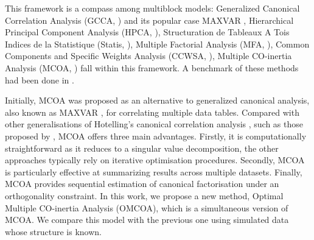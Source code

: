 \documentclass[11pt]{article}
\begin{document}
This framework is a compass among multiblock models:  Generalized Canonical Correlation Analysis (GCCA, \cite{Carroll68}) and its popular case MAXVAR \cite{Carroll68}, Hierarchical Principal Component Analysis (HPCA, \cite{Wold96,Westerhuis98}), Structuration de Tableaux A Tois Indices de la Statistique (Statis, \cite{Lavit94}), Multiple Factorial Analysis (MFA, \cite{escofier1994}), Common Components and Specific Weights Analysis (CCWSA, \cite{Qannari001}), Multiple CO-inertia Analysis (MCOA, \cite{Chessel96})  fall within this framework. A benchmark of these methods had been done in \cite{Bougeard024}.

Initially, MCOA was proposed as an alternative to generalized canonical analysis, also known as MAXVAR \cite{Carroll68,Horst59}, for correlating multiple data tables. Compared with other generalisations of Hotelling's canonical correlation analysis \cite{Hotelling35}, such as those proposed by \cite{Kettenring71}, MCOA offers three main advantages. Firstly, it is computationally straightforward as it reduces to a singular value decomposition, the other approaches typically rely on iterative optimisation procedures. Secondly, MCOA is particularly effective at summarizing results across multiple datasets. Finally, MCOA provides sequential estimation of canonical factorisation under an orthogonality constraint.  In this work, we propose a new method, Optimal Multiple CO-inertia Analysis (OMCOA), which is a simultaneous version of MCOA. We compare this model with the previous one using simulated data whose structure is known.     


\end{document}
